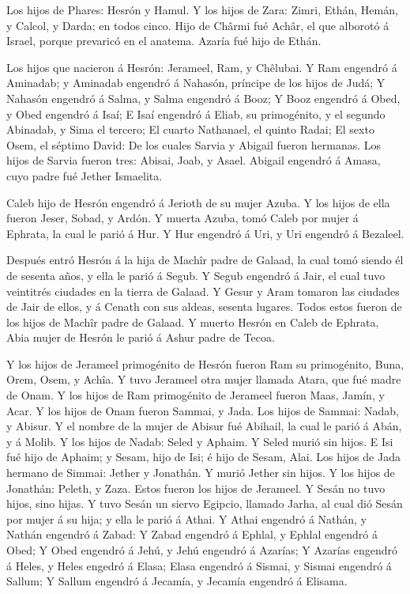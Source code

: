  Los hijos de Phares: Hesrón y Hamul.  Y los
hijos de Zara: Zimri, Ethán, Hemán, y Calcol, y Darda; en todos cinco.
 Hijo de Chârmi fué Achâr, el que alborotó á Israel, porque
prevaricó en el anatema.  Azaría fué hijo de Ethán.

 Los hijos que nacieron á Hesrón: Jerameel, Ram, y Chêlubai.
 Y Ram engendró á Aminadab; y Aminadab engendró á Nahasón,
príncipe de los hijos de Judá;  Y Nahasón engendró á Salma,
y Salma engendró á Booz;  Y Booz engendró á Obed, y Obed
engendró á Isaí;  E Isaí engendró á Eliab, su primogénito,
y el segundo Abinadab, y Sima el tercero;  El cuarto
Nathanael, el quinto Radai;  El sexto Osem, el séptimo
David:  De los cuales Sarvia y Abigail fueron hermanas. Los
hijos de Sarvia fueron tres: Abisai, Joab, y Asael. 
Abigail engendró á Amasa, cuyo padre fué Jether Ismaelita.

 Caleb hijo de Hesrón engendró á Jerioth de su mujer Azuba.
Y los hijos de ella fueron Jeser, Sobad, y Ardón.  Y muerta
Azuba, tomó Caleb por mujer á Ephrata, la cual le parió á Hur.
 Y Hur engendró á Uri, y Uri engendró á Bezaleel.

 Después entró Hesrón á la hija de Machîr padre de Galaad,
la cual tomó siendo él de sesenta años, y ella le parió á Segub.
 Y Segub engendró á Jair, el cual tuvo veintitrés ciudades
en la tierra de Galaad.  Y Gesur y Aram tomaron las
ciudades de Jair de ellos, y á Cenath con sus aldeas, sesenta lugares.
Todos estos fueron de los hijos de Machîr padre de Galaad. 
Y muerto Hesrón en Caleb de Ephrata, Abia mujer de Hesrón le parió á
Ashur padre de Tecoa.

 Y los hijos de Jerameel primogénito de Hesrón fueron Ram
su primogénito, Buna, Orem, Osem, y Achîa.  Y tuvo Jerameel
otra mujer llamada Atara, que fué madre de Onam.  Y los
hijos de Ram primogénito de Jerameel fueron Maas, Jamín, y Acar.
 Y los hijos de Onam fueron Sammai, y Jada. Los hijos de
Sammai: Nadab, y Abisur.  Y el nombre de la mujer de Abisur
fué Abihail, la cual le parió á Abán, y á Molib.  Y los
hijos de Nadab: Seled y Aphaim. Y Seled murió sin hijos.  E
Isi fué hijo de Aphaim; y Sesam, hijo de Isi; é hijo de Sesam, Alai.
 Los hijos de Jada hermano de Simmai: Jether y Jonathán. Y
murió Jether sin hijos.  Y los hijos de Jonathán: Peleth, y
Zaza. Estos fueron los hijos de Jerameel.  Y Sesán no tuvo
hijos, sino hijas.  Y tuvo Sesán un siervo Egipcio, llamado
Jarha, al cual dió Sesán por mujer á su hija; y ella le parió á Athai.
 Y Athai engendró á Nathán, y Nathán engendró á Zabad:
 Y Zabad engendró á Ephlal, y Ephlal engendró á Obed;
 Y Obed engendró á Jehú, y Jehú engendró á Azarías;
 Y Azarías engendró á Heles, y Heles engedró á Elasa;
 Elasa engendró á Sismai, y Sismai engendró á Sallum;
 Y Sallum engendró á Jecamía, y Jecamía engendró á Elisama.


